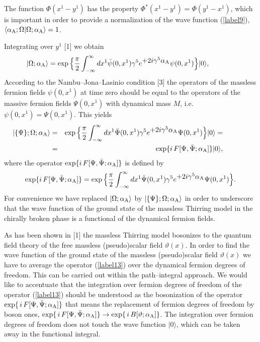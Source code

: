 \documentclass[a4paper,12pt] {article}
\begin{document}
%
The function $\Phi(x^1 - y^1)$ has the property $\Phi^*(x^1 - y^1) =
\Phi(y^1 - x^1)$, which is important in order to provide a
normalization of the wave function (\ref{label9}), $\langle
\alpha_{\rm A}; \Omega |\Omega; \alpha_{\rm A}\rangle = 1$.

Integrating over $y^1$ [1] we obtain
%
\begin{eqnarray}\label{label11}
\hspace{-0.5in}|\Omega; \alpha_{\rm A}\rangle =
\exp\Big\{\frac{\pi}{2}
\int^{\infty}_{-\infty}dx^1\bar{\psi}(0,x^1)\gamma^5e^{\textstyle
+2i\gamma^5\alpha_{\rm A}}\psi(0,x^1)\Big\}|0\rangle,
\end{eqnarray}
%
According to the Nambu--Jona--Lasinio condition [3] the operators of
the massless fermion fields $\psi(0,x^1)$ at time zero should be equal
to the operators of the massive fermion fields $\Psi(0,x^1)$ with
dynamical mass $M$, i.e. $\psi(0,x^1) = \Psi(0,x^1)$.  This yields
%
\begin{eqnarray}\label{label12}
\hspace{-0.5in}|\{\Psi\};\Omega; \alpha_{\rm A}\rangle &=& \exp\Big\{
\frac{\pi}{2}\int^{\infty}_{-\infty}dx^1\bar{\Psi}(0,x^1)
\gamma^5e^{\textstyle +2i\gamma^5\alpha_{\rm A}}\Psi(0,x^1)\Big\}
|0\rangle =\nonumber\\ &=& \exp\{i\,F[\Psi, \bar{\Psi}; \alpha_{\rm
A}]\} |0\rangle,
\end{eqnarray}
%
where the operator $\exp\{i\,F[\Psi, \bar{\Psi}; \alpha_{\rm
A}]\}$ is defined by
%
\begin{eqnarray}\label{label13}
\exp\{i\,F[\Psi, \bar{\Psi}; \alpha_{\rm A}]\} = \exp\Big\{
\frac{\pi}{2}\int^{\infty}_{-\infty}dx^1\bar{\Psi}(0,x^1)
\gamma^5e^{\textstyle +2i\gamma^5\alpha_{\rm A}}\Psi(0,x^1)\Big\}.
\end{eqnarray}
%
For convenience we have replaced $|\Omega; \alpha_{\rm A}\rangle$ by
$|\{\Psi\};\Omega; \alpha_{\rm A}\rangle$ in order to underscore that
the wave function of the ground state of the massless Thirring model
in the chirally broken phase is a functional of the dynamical fermion
fields.

As has been shown in [1] the massless Thirring model bosonizes to the
quantum field theory of the free massless (pseudo)scalar field
$\vartheta(x)$. In order to find the wave function of the ground state
of the massless (pseudo)scalar field $\vartheta(x)$ we have to average
the operator (\ref{label13}) over the dynamical fermion degrees of
freedom. This can be carried out within the path--integral approach.
We would like to accentuate that the integration over fermion degrees
of freedom of the operator (\ref{label13}) should be understood as the
bosonization of the operator $\exp\{\,i\,F[\Psi,
\bar{\Psi};\alpha_{\rm A}]\}$ that means the replacement of fermion
degrees of freedom by boson ones, $\exp\{\,i\,F[\Psi,
\bar{\Psi};\alpha_{\rm A}]\} \to \exp\{\,i\,B[\vartheta; \alpha_{\rm
A}]\}$. The integration over fermion degrees of freedom does not touch
the wave function $|0\rangle$, which can be taken away in the
functional integral.
\end{document}
